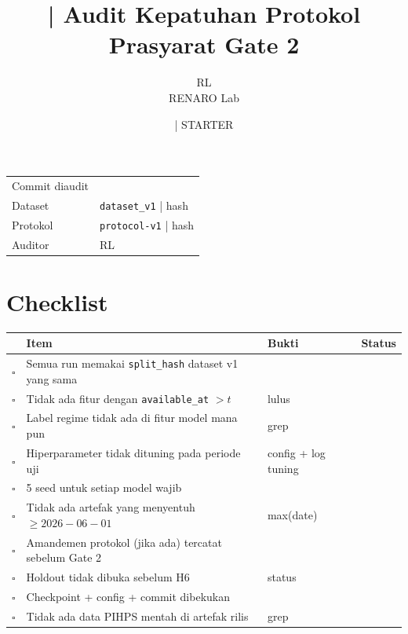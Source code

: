 \documentclass[11pt,a4paper]{article}
\title{\jobid{RL-H5-02} | Audit Kepatuhan Protokol\\
\large Prasyarat Gate 2}
\author{RL \\ \small RENARO Lab}
\date{\todo{tanggal H5} \quad | \quad \textcolor{red!75!black}{STARTER}}
\begin{document}
\maketitle

\begin{table}[H]
\centering
\small
\begin{tabular}{@{}L{3.6cm}L{10.2cm}@{}}
\toprule
Commit diaudit &  \\
Dataset & \texttt{dataset\_v1} | hash \todo{} \\
Protokol & \texttt{protocol-v1} | hash \todo{} \\
Auditor & RL \\
\bottomrule
\end{tabular}
\end{table}

\section{Checklist}
\begin{longtable}{@{}C{0.8cm}L{6.7cm}L{3.9cm}C{2.0cm}@{}}
\toprule
& Item & Bukti & Status \\
\midrule
\endhead
$\square$ & Semua run memakai \texttt{split\_hash} dataset v1 yang sama
&  & \todo{} \\
$\square$ & Tidak ada fitur dengan \texttt{available\_at} $>t$
&  lulus & \todo{} \\
$\square$ & Label regime tidak ada di fitur model mana pun
& grep  & \todo{} \\
$\square$ & Hiperparameter tidak dituning pada periode uji
& config + log tuning & \todo{} \\
$\square$ & 5 seed untuk setiap model wajib
&  & \todo{} \\
$\square$ & Tidak ada artefak yang menyentuh $\ge 2026-06-01$
&  max(date) & \todo{} \\
$\square$ & Amandemen protokol (jika ada) tercatat sebelum Gate 2
&  & \todo{} \\
$\square$ & Holdout tidak dibuka sebelum H6
&  status & \todo{} \\
$\square$ & Checkpoint + config + commit dibekukan
&  & \todo{} \\
$\square$ & Tidak ada data PIHPS mentah di artefak rilis
& grep  & \todo{} \\
\bottomrule
\end{longtable}
\end{document}
